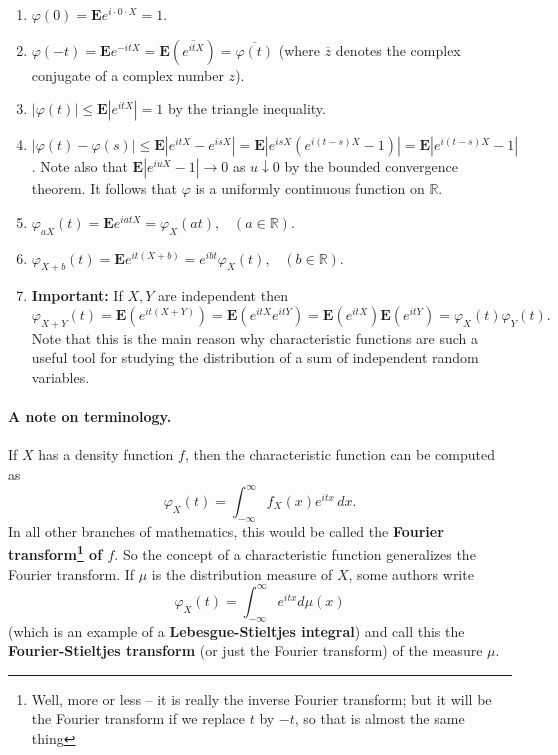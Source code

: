 \documentclass[12pt]{article}
\newcommand{\R}{\mathbb{R}}
\newcommand{\expec}{\mathbf{E}}
\theoremstyle{example}
\begin{document}
\begin{enumerate}
\item $ \varphi(0) = \expec e^{i\cdot 0\cdot X} = 1$.
\item $ \varphi(-t) = \expec e^{-i t X} = \expec \left(\overline{e^{it X}}\right) = \overline{\varphi(t)}$ (where $\overline{z}$ denotes the complex conjugate of a complex number $z$).
\item $ |\varphi(t)| \le \expec\left|e^{i t X}\right| = 1$ by the triangle inequality.
\item $ |\varphi(t)-\varphi(s)| \le \expec \left| e^{i t X} - e^{isX}\right|
= \expec \left|e^{i s X} \left(e^{i(t-s)X}-1\right)\right| = \expec \left| e^{i(t-s)X}-1\right|$. Note also that $\expec \left|e^{i u X}-1\right|\to 0$ as $u \downarrow 0$ by the bounded convergence theorem. It follows that $\varphi$ is a uniformly continuous function on $\R$.
\item $\varphi_{a X}(t) = \expec e^{i a t X} = \varphi_X(a t)$,\ \ $(a\in\R)$.
\item $\varphi_{X+b}(t) = \expec e^{i t (X+b)} = e^{i b t} \varphi_X(t)$,\ \ $(b\in\R)$.
\item \textbf{Important:} If $X,Y$ are independent then $$\varphi_{X+Y}(t) = \expec\left(e^{it(X+Y)}\right)
= \expec\left(e^{itX} e^{itY}\right) = \expec\left(e^{itX}\right) \expec \left(e^{itY}\right) = \varphi_X(t) \varphi_Y(t).$$
Note that this is the main reason why characteristic functions are such a useful tool for studying the distribution of a sum of independent random variables.
\end{enumerate}

\paragraph{A note on terminology.} If $X$ has a density function $f$, then the characteristic function can be computed as
$$ \varphi_X(t) = \int_{-\infty}^\infty f_X(x) e^{itx}\,dx. $$
In all other branches of mathematics, this would be called the \textbf{Fourier transform\footnote{Well, more or less -- it is really the inverse Fourier transform; but it will be the Fourier transform if we replace $t$ by $-t$, so that is almost the same thing} of $f$}.
So the concept of a characteristic function generalizes the Fourier transform. If $\mu$ is the distribution measure of $X$, some authors write
$$ \varphi_X(t) = \int_{-\infty}^\infty e^{itx} d\mu(x) $$
(which is an example of a \textbf{Lebesgue-Stieltjes integral}) and call this the \textbf{Fourier-Stieltjes transform} (or just the Fourier transform) of the measure $\mu$.
\end{document}
